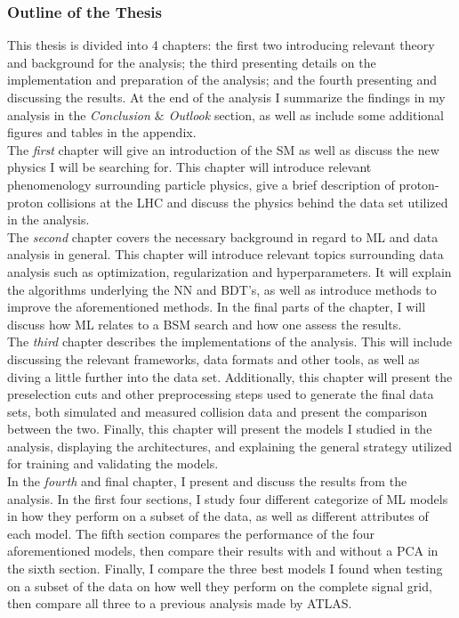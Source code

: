 \subsubsection*{Outline of the Thesis}
This thesis is divided into 4 chapters: the first two introducing relevant theory and background for the analysis; the third presenting 
details on the implementation and preparation of the analysis; and the fourth presenting and discussing the results. At the end of the analysis I summarize 
the findings in my analysis in the \emph{Conclusion $\&$ Outlook} section, as well as include some additional figures and tables 
in the appendix. 
\\
The \emph{first} chapter will give an introduction of the \ac{SM} as well as discuss the new physics I will be searching for. This chapter will 
introduce relevant phenomenology surrounding particle physics, give a brief description of proton-proton collisions at the \ac{LHC} and discuss 
the physics behind the data set utilized in the analysis. 
\\
The \emph{second} chapter covers the necessary background in regard to \ac{ML} and data analysis in general. This chapter will introduce relevant topics
surrounding data analysis such as optimization, regularization and hyperparameters. It will explain the algorithms underlying the \ac{NN} and 
\ac{BDT}'s, as well as introduce methods to improve the aforementioned methods. In the final parts of the chapter, I will discuss how \ac{ML} relates to 
a \ac{BSM} search and how one assess the results.
\\
The \emph{third} chapter describes the implementations of the analysis. This will include discussing the relevant frameworks, data formats and 
other tools, as well as diving a little further into the data set. Additionally, this chapter will present the preselection cuts and other preprocessing steps
used to generate the final data sets, both simulated and measured collision data and present the comparison between the two. Finally, this chapter will present the 
models I studied in the analysis, displaying the architectures, and explaining the general strategy utilized for training and validating the models.
\\
In the \emph{fourth} and final chapter, I present and discuss the results from the analysis. In the first four sections, I study four different categorize of \ac{ML} models in how they 
perform on a subset of the data, as well as different attributes of each model. The fifth section compares the performance of the four aforementioned models, then compare 
their results with and without a \acs{PCA} in the sixth section. Finally, I compare the three best models I found when testing on a subset of the data on how well they perform 
on the complete signal grid, then compare all three to a previous analysis made by \acs{ATLAS}.



